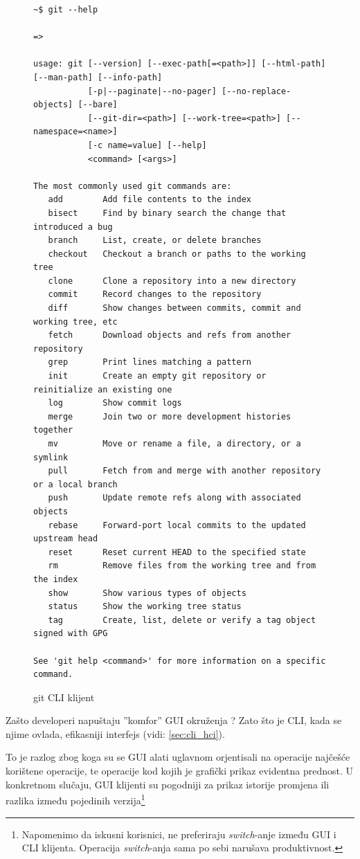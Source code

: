 \documentclass[times, utf8, seminar]{fit}
\begin{document}
\begin{figure}[H]
\begin{lstlisting}
~$ git --help

=>

usage: git [--version] [--exec-path[=<path>]] [--html-path] [--man-path] [--info-path]
           [-p|--paginate|--no-pager] [--no-replace-objects] [--bare]
           [--git-dir=<path>] [--work-tree=<path>] [--namespace=<name>]
           [-c name=value] [--help]
           <command> [<args>]

The most commonly used git commands are:
   add        Add file contents to the index
   bisect     Find by binary search the change that introduced a bug
   branch     List, create, or delete branches
   checkout   Checkout a branch or paths to the working tree
   clone      Clone a repository into a new directory
   commit     Record changes to the repository
   diff       Show changes between commits, commit and working tree, etc
   fetch      Download objects and refs from another repository
   grep       Print lines matching a pattern
   init       Create an empty git repository or reinitialize an existing one
   log        Show commit logs
   merge      Join two or more development histories together
   mv         Move or rename a file, a directory, or a symlink
   pull       Fetch from and merge with another repository or a local branch
   push       Update remote refs along with associated objects
   rebase     Forward-port local commits to the updated upstream head
   reset      Reset current HEAD to the specified state
   rm         Remove files from the working tree and from the index
   show       Show various types of objects
   status     Show the working tree status
   tag        Create, list, delete or verify a tag object signed with GPG

See 'git help <command>' for more information on a specific command.
\end{lstlisting}
\caption{git CLI klijent}
\end{figure}

Zašto developeri napuštaju ''komfor'' GUI okruženja ? Zato što je CLI, kada se njime ovlada, efikasniji interfejs (vidi: \ref{sec:cli_hci}).

To je razlog zbog koga su se GUI alati uglavnom orjentisali na operacije najčešće korištene operacije, te operacije kod kojih je grafički prikaz evidentna prednost. U konkretnom slučaju, GUI klijenti su pogodniji za prikaz istorije promjena ili razlika između pojedinih verzija\footnote{Napomenimo da iskusni korisnici, ne preferiraju \emph{switch}-anje između GUI i CLI klijenta. Operacija \emph{switch}-anja sama po sebi narušava produktivnost.}
\end{document}
